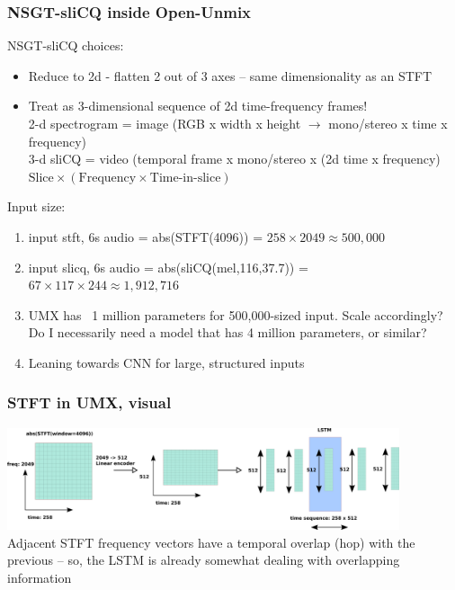 \documentclass[usenames,dvipsnames]{beamer}
\begin{document}
\begin{frame}
	\frametitle{NSGT-sliCQ inside Open-Unmix}
	NSGT-sliCQ choices:
	\begin{itemize}
		\item
			Reduce to 2d - flatten 2 out of 3 axes -- same dimensionality as an STFT
		\item
			Treat as 3-dimensional sequence of 2d time-frequency frames!\\
			2-d spectrogram = image (RGB x width x height $\rightarrow$ mono/stereo x time x frequency)\\
			3-d sliCQ = video (temporal frame x mono/stereo x (2d time x frequency)\\
			$\text{Slice} \times (\text{Frequency} \times \text{Time-in-slice})$
	\end{itemize}
	Input size:
	\begin{enumerate}
		\item
			input stft, 6s audio = abs(STFT(4096)) = $258 \times 2049 \approx 500,000$
		\item
			input slicq, 6s audio = abs(sliCQ(mel,116,37.7)) = $67 \times 117 \times 244 \approx 1,912,716$
		\item
			UMX has ~1 million parameters for 500,000-sized input. Scale accordingly? Do I necessarily need a model that has 4 million parameters, or similar?
		\item
			Leaning towards CNN for large, structured inputs
	\end{enumerate}
\end{frame}

\begin{frame}
	\frametitle{STFT in UMX, visual}
	\includegraphics[height=3cm]{./umxstftlstm.png}\\
	Adjacent STFT frequency vectors have a temporal overlap (hop) with the previous -- so, the LSTM is already somewhat dealing with overlapping information
\end{frame}
\end{document}

